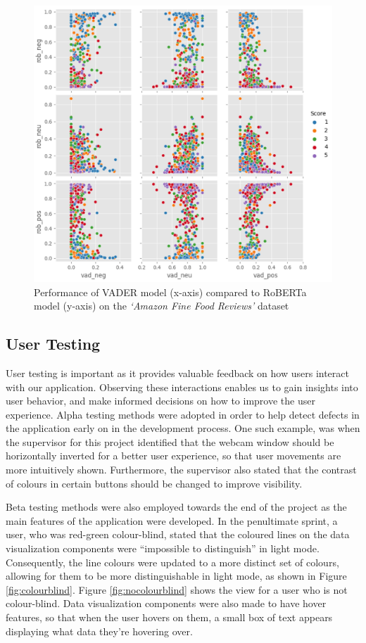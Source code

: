 \documentclass[12pt, a4paper]{article}
\newcommand{\np}
    {
    \vskip 0.4cm
    }
\begin{document}
\begin{figure}[H]
    \centering
    \includegraphics[scale=0.50]{images/sacomparison.png}
    \caption{Performance of VADER model (x-axis) compared to RoBERTa model (y-axis) on the \textit{`Amazon Fine Food Reviews'} dataset}
    \label{fig:sacomparison}
\end{figure}

\subsection{User Testing}

User testing is important as it provides valuable feedback on how users interact with our application. Observing these interactions enables us to gain insights into user behavior, and make informed decisions on how to improve the user experience. Alpha testing methods were adopted in order to help detect defects in the application early on in the development process. One such example, was when the supervisor for this project identified that the webcam window should be horizontally inverted for a better user experience, so that user movements are more intuitively shown. Furthermore, the supervisor also stated that the contrast of colours in certain buttons should be changed to improve visibility.
\np
Beta testing methods were also employed towards the end of the project as the main features of the application were developed. In the penultimate sprint, a user, who was red-green colour-blind, stated that the coloured lines on the data visualization components were ``impossible to distinguish'' in light mode. Consequently, the line colours were updated to a more distinct set of colours, allowing for them to be more distinguishable in light mode, as shown in Figure \ref{fig:colourblind}. Figure \ref{fig:nocolourblind} shows the view for a user who is not colour-blind. Data visualization components were also made to have hover features, so that when the user hovers on them, a small box of text appears displaying what data they're hovering over. 
\end{document}
